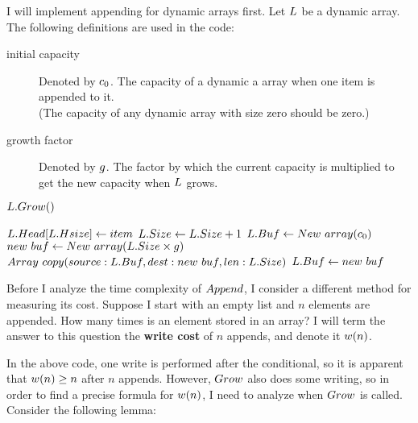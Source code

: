 \HdrDynArrayImpl

I will implement appending for dynamic arrays first. Let $L$ be a dynamic array. The following definitions are used in the code:

\begin{description}
	\item[initial capacity] Denoted by $c_0$. The capacity of a dynamic a array when one item is appended to it.\\
	(The capacity of any dynamic array with size zero should be zero.)
	\item[growth factor] Denoted by $g$. The factor by which the current capacity is multiplied to get the new capacity when $L$ grows.
\end{description}

\begin{algorithm}
	\begin{algorithmic}[1]
				\State $L.Grow()$
			\EndIf
			
			\State $L.Head[L.Hsize] \gets item$
			\State $L.Size \gets L.Size + 1$
		\EndProcedure
		\Statex
				\State $L.Buf \gets New\ array(c_0)$
			\Else
				\State $new\ buf \gets \FuncNewArray(\VarList.\FieldSize \times \VarGrowthFactor)$
				\State $Array\ copy(source: L.Buf, dest: new\ buf, len: L.Size)$
				\State $L.Buf \gets new\ buf$
			\EndIf
		\EndProcedure
	\end{algorithmic}
\end{algorithm}

\HdrTimeComplex

Before I analyze the time complexity of $Append$, I consider a different method for measuring its cost. Suppose I start with an empty list and $n$ elements are appended. How many times is an element stored in an array? I will term the answer to this question the \textbf{write cost} of $n$ appends, and denote it $w(n)$.

In the above code, one write is performed after the conditional, so it is apparent that $w(n) \geq n$ after $n$ appends. However, $Grow$ also does some writing, so in order to find a precise formula for $w(n)$, I need to analyze when $Grow$ is called. Consider the following lemma:

